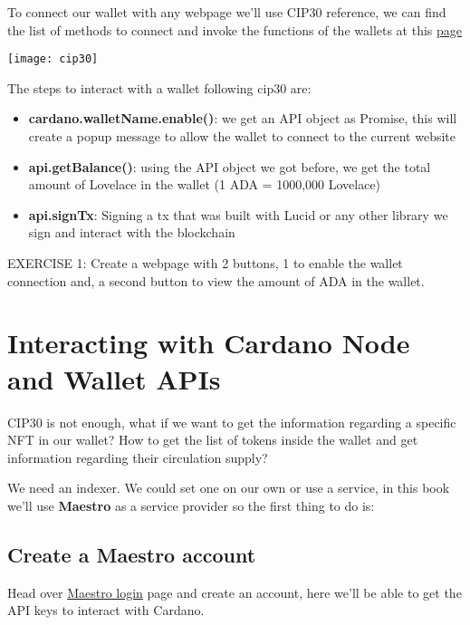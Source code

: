 To connect our wallet with any webpage we'll use \gls{CIP}30 reference, we can find the list of methods to connect and invoke the functions of the wallets at this \href{https://www.cardano-caniuse.io/}{page}

\texttt{[image: cip30]}

The steps to interact with a wallet following cip30 are:

\begin{itemize}
    \item \textbf{cardano.{walletName}.enable()}: we get an API object as Promise, this will create a popup message to allow the wallet to connect to the current website
    \item \textbf{api.getBalance()}: using the API object we got before, we get the total amount of Lovelace in the wallet (1 ADA = 1000,000 Lovelace)
    \item \textbf{api.signTx}: Signing a tx that was built with Lucid or any other library we sign and interact with the blockchain 
\end{itemize}

\begin{remark}
    EXERCISE 1: Create a webpage with 2 buttons, 1 to enable the wallet connection and, a second button to view the amount of ADA in the wallet.
\end{remark}




\section{Interacting with Cardano Node and Wallet APIs}

CIP30 is not enough, what if we want to get the information regarding a specific NFT in our wallet?
How to get the list of tokens inside the wallet and get information regarding their circulation supply?

We need an indexer. We could set one on our own or use a service, in this book we'll use \textbf{Maestro} as a service provider so the first thing to do is:

\subsection{Create a Maestro account}

Head over \href{https://dashboard.gomaestro.org/login}{Maestro login} page and create an account, here we'll be able to get the API keys to interact with Cardano.

